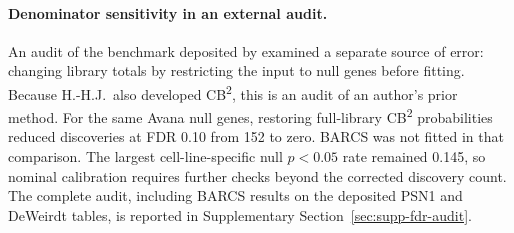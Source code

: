 \paragraph{Denominator sensitivity in an external audit.}
An audit of the benchmark deposited by \citet{dempster2025fdr,dempster2025fdrdata}
examined a separate source of error: changing library totals by restricting
the input to null genes before fitting.  Because H.-H.J.\ also developed
CB\textsuperscript{2}, this is an audit of an author's prior method.  For the
same Avana null genes, restoring full-library CB\textsuperscript{2}
probabilities reduced discoveries at FDR 0.10 from 152 to zero.  BARCS was not
fitted in that comparison.  The largest cell-line-specific null $p<0.05$ rate
remained 0.145, so nominal calibration requires further checks beyond the
corrected discovery count.  The complete audit, including BARCS results on the deposited
PSN1 and DeWeirdt tables, is reported in Supplementary
Section~\ref{sec:supp-fdr-audit}.

